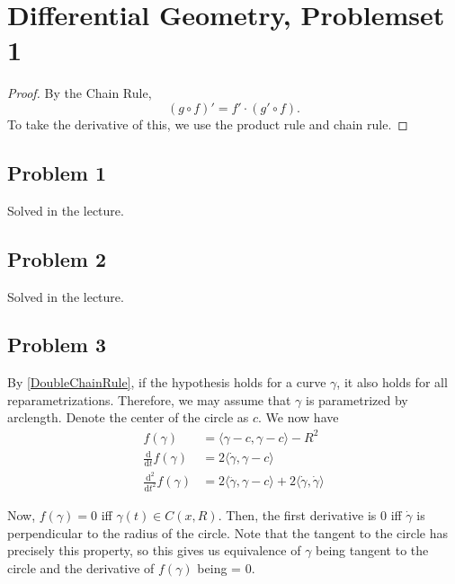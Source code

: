 \chapter{Differential Geometry, Problemset 1}

\begin{proof}
    By the Chain Rule,
\[
    (g\circ f)' = f' \cdot (g' \circ f).
\]
    To take the derivative of this, we use the product rule and chain rule.
\end{proof}


\section*{Problem 1}
Solved in the lecture.

\section*{Problem 2}
Solved in the lecture.

\section*{Problem 3}

By \ref{DoubleChainRule}, if the hypothesis holds for a curve \(\gamma\), it also holds for all reparametrizations. Therefore, we may assume that \(\gamma\) is parametrized by arclength. Denote the center of the circle as \(c\). We now have
\begin{align*}
    f(\gamma) &= \langle \gamma - c, \gamma - c \rangle - R^2 \\
    \frac{\mathrm{d}}{\mathrm{d}t} f(\gamma) &= 2\langle \dot\gamma, \gamma - c \rangle \\
    \frac{\mathrm{d^2}}{\mathrm{d}t^2} f(\gamma) &= 2\langle \ddot\gamma, \gamma - c \rangle + 2\langle \dot\gamma, \dot\gamma \rangle
\end{align*}

Now, \(f(\gamma) = 0\) iff \(\gamma(t) \in C(x, R)\). Then, the first derivative is 0 iff \(\dot\gamma\) is perpendicular to the radius of the circle. Note that the tangent to the circle has precisely this property, so this gives us equivalence of \(\gamma\) being tangent to the circle and the derivative of \(f(\gamma)\) being = 0.

